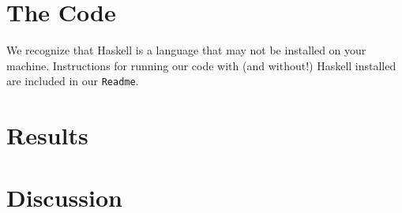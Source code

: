 \documentclass{article}
\begin{document}

\section{The Code}

We recognize that Haskell is a language that may not be installed on your
machine.  Instructions for running our code with (and without!) Haskell
installed are included in our \verb+Readme+.

\section{Results}


\section{Discussion}
\end{document}

